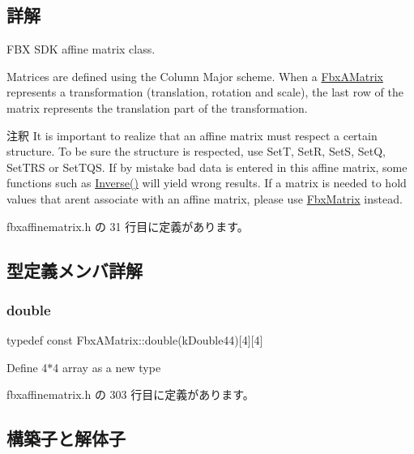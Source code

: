 \subsection{詳解}
F\+BX S\+DK affine matrix class.

Matrices are defined using the Column Major scheme. When a \hyperlink{class_fbx_a_matrix}{Fbx\+A\+Matrix} represents a transformation (translation, rotation and scale), the last row of the matrix represents the translation part of the transformation.

\begin{DoxyRemark}{注釈}
It is important to realize that an affine matrix must respect a certain structure. To be sure the structure is respected, use SetT, SetR, SetS, SetQ, Set\+T\+RS or Set\+T\+QS. If by mistake bad data is entered in this affine matrix, some functions such as \hyperlink{class_fbx_a_matrix_a4093cf977851b49760e1c24c99d5bae7}{Inverse()} will yield wrong results. If a matrix is needed to hold values that aren\textquotesingle{}t associate with an affine matrix, please use \hyperlink{class_fbx_matrix}{Fbx\+Matrix} instead. 
\end{DoxyRemark}


 fbxaffinematrix.\+h の 31 行目に定義があります。



\subsection{型定義メンバ詳解}
\mbox{\label{class_fbx_a_matrix_ad463edbb9fea344643297701f159faa7}} 
\subsubsection{\texorpdfstring{double}{double}}
{\footnotesize\ttfamily typedef const Fbx\+A\+Matrix\+::double(k\+Double44)\mbox{[}4\mbox{]}\mbox{[}4\mbox{]}}



Define 4$\ast$4 array as a new type 



 fbxaffinematrix.\+h の 303 行目に定義があります。



\subsection{構築子と解体子}
\mbox{\label{class_fbx_a_matrix_afde94bf7fa3e5a001cf8c0733aab69ea}} 
